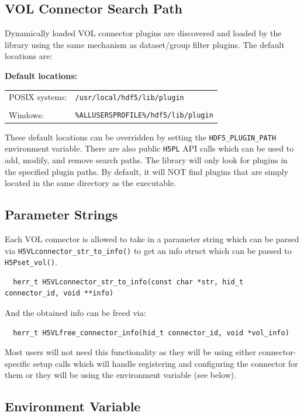 \subsection{VOL Connector Search Path}

Dynamically loaded VOL connector plugins are discovered and loaded by the library using the same mechanism as dataset/group filter plugins. The default locations are:

\textbf{Default locations:}

\begin{tabular}{ l l }
    POSIX systems: &  {\tt /usr/local/hdf5/lib/plugin} \\
     & \\
    Windows: & {\tt \%ALLUSERSPROFILE\%/hdf5/lib/plugin}
\end{tabular}

These default locations can be overridden by setting the {\tt HDF5\_PLUGIN\_PATH} environment variable. There are also public {\tt H5PL} API calls which can be used to add, modify, and remove search paths. The library will only look for plugins in the specified plugin paths. By default, it will NOT find plugins that are simply located in the same directory as the executable.

\subsection{Parameter Strings}

Each VOL connector is allowed to take in a parameter string which can be parsed via {\tt H5VLconnector\_str\_to\_info()} to get an info struct which can be passed to {\tt H5Pset\_vol()}.

\begin{lstlisting}
  herr_t H5VLconnector_str_to_info(const char *str, hid_t connector_id, void **info)
\end{lstlisting}

And the obtained info can be freed via:

\begin{lstlisting}
  herr_t H5VLfree_connector_info(hid_t connector_id, void *vol_info)
\end{lstlisting}

Most users will not need this functionality as they will be using either connector-specific setup calls which will handle registering and configuring the connector for them or they will be using the environment variable (see below).

\subsection{Environment Variable}

